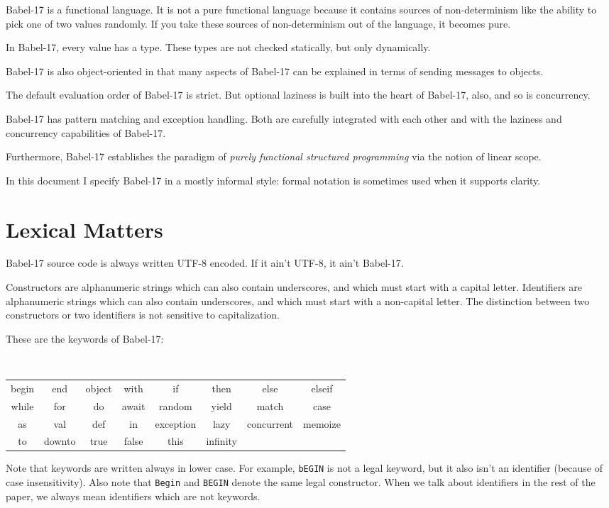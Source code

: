 \documentclass[11pt]{amsart}
\begin{document}
Babel-17 is a functional language. It is not a pure functional language because it contains sources of non-determinism like the ability to pick one of two values randomly. If you take these sources of non-determinism out of the language, it becomes pure. 

In Babel-17, every value has a type. These types are not checked statically, but only dynamically. 

Babel-17 is also object-oriented in that many aspects of Babel-17 can be explained in terms of sending messages to objects. 

The default evaluation order of Babel-17 is strict. But optional laziness is built into the heart of Babel-17, also, and so is concurrency. 

Babel-17 has pattern matching and exception handling. Both are carefully integrated with each other and with the laziness and concurrency capabilities of Babel-17.

Furthermore, Babel-17 establishes the paradigm of \emph{purely functional structured programming}  via the notion of linear scope.

In this document  I specify Babel-17 in a mostly informal style: formal notation is sometimes used when it supports clarity.

\section{Lexical Matters}
Babel-17 source code is always written UTF-8 encoded. If it ain't UTF-8, it ain't Babel-17. 

Constructors are alphanumeric strings which can also contain underscores, and which must start with a capital letter. 
Identifiers are alphanumeric strings which can also contain underscores, and which must start with a non-capital letter.
The distinction between two constructors or two identifiers is not sensitive to capitalization.

These are the keywords of Babel-17:
\begin{center}
\tt
\begin{tabular}{cccccccc}
begin & end & object & with & if & then & else & elseif \\
while &  for & do & await & random & yield & match & case \\
as & val & def & in & exception & lazy & concurrent & memoize \\
to & downto & true & false & this & infinity &  & 
\end{tabular}
\end{center}
Note that keywords are written always in lower case. For example, {\tt bEGIN} is not a legal keyword, but it also isn't an identifier (because of case insensitivity). Also note that {\tt Begin} and {\tt BEGIN} denote the same legal constructor. When we talk about identifiers in the rest of the paper, we always mean identifiers which are not keywords.
\end{document}
